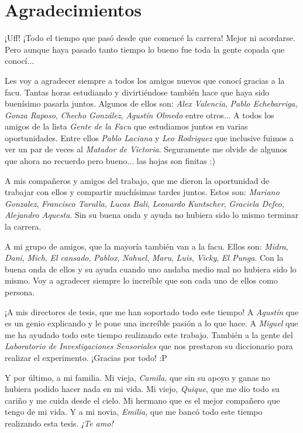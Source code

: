 \chapter*{Agradecimientos}

\noindent ¡Uff! ¡Todo el tiempo que pasó desde que comencé la carrera! Mejor ni acordarse. Pero aunque haya pasado tanto tiempo lo bueno fue toda la gente copada que conocí...

\noindent Les voy a agradecer siempre a todos los amigos nuevos que conocí gracias a la facu. Tantas horas estudiando y divirtiéndose también hace que haya sido buenísimo pasarla juntos. Algunos de ellos son: \textit{Alex Valencia}, \textit{Pablo Echebarriga}, \textit{Gonza Raposo}, \textit{Checho González}, \textit{Agustín Olmedo} entre otros... A todos los amigos de la lista \textit{Gente de la Facu} que estudiamos juntos en varias oportunidades. Entre ellos \textit{Pablo Laciana} y \textit{Leo Rodriguez} que inclusive fuimos a ver un par de veces al \textit{Matador de Victoria}. Seguramente me olvide de algunos que ahora no recuerdo pero bueno... las hojas son finitas :) 

\noindent A mis compañeros y amigos del trabajo, que me dieron la oportunidad de trabajar con ellos y compartir muchísimas tardes juntos. Estos son: \textit{Mariano Gonzalez}, \textit{Francisco Tarulla}, \textit{Lucas Bali}, \textit{Leonardo Kuntscher}, \textit{Graciela Defeo}, \textit{Alejandro Aquesta}. Sin su buena onda y ayuda no hubiera sido lo mismo terminar la carrera.

\noindent A mi grupo de amigos, que la mayoría también van a la facu. Ellos son: \textit{Midra}, \textit{Dani}, \textit{Mich}, \textit{El cansado}, \textit{Pablox}, \textit{Nahuel}, \textit{Maru}, \textit{Luis}, \textit{Vicky}, \textit{El Punga}. Con la buena onda de ellos y su ayuda cuando uno andaba medio mal no hubiera sido lo mismo. Voy a agradecer siempre lo increíble que son cada uno de ellos como persona.

\noindent ¡A mis directores de tesis, que me han soportado todo este tiempo! A \textit{Agustín} que es un genio explicando y le pone una increíble pasión a lo que hace. A \textit{Miguel} que me ha ayudado todo este tiempo realizando este trabajo. También a la gente del \textit{Laboratorio de Investigaciones Sensoriales} que nos prestaron su diccionario para realizar el experimento. ¡Gracias por todo! :P

\noindent Y por último, a mi familia. Mi vieja, \textit{Camila}, que sin su apoyo y ganas no hubiera podido hacer nada en mi vida. Mi viejo, \textit{Quique}, que me dio todo su cariño y me cuida desde el cielo. Mi hermano que es el mejor compañero que tengo de mi vida. Y a mi novia, \textit{Emilia}, que me bancó todo este tiempo realizando esta tesis. \textit{¡Te amo!}   

   

